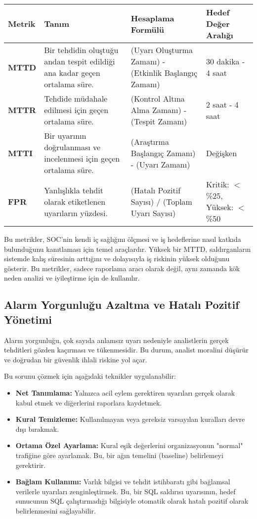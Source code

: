\begin{longtable}{|p{2cm}|p{3.5cm}|p{3.5cm}|p{3cm}|}
\hline
\textbf{Metrik} & \textbf{Tanım} & \textbf{Hesaplama Formülü} & \textbf{Hedef Değer Aralığı} \\
\hline
\textbf{MTTD} & Bir tehdidin oluştuğu andan tespit edildiği ana kadar geçen ortalama süre. & (Uyarı Oluşturma Zamanı) - (Etkinlik Başlangıç Zamanı) & 30 dakika - 4 saat \\
\hline
\textbf{MTTR} & Tehdide müdahale edilmesi için geçen ortalama süre. & (Kontrol Altına Alma Zamanı) - (Tespit Zamanı) & 2 saat - 4 saat \\
\hline
\textbf{MTTI} & Bir uyarının doğrulanması ve incelenmesi için geçen ortalama süre. & (Araştırma Başlangıç Zamanı) - (Uyarı Zamanı) & Değişken \\
\hline
\textbf{FPR} & Yanlışlıkla tehdit olarak etiketlenen uyarıların yüzdesi. & (Hatalı Pozitif Sayısı) / (Toplam Uyarı Sayısı) & Kritik: $<$\%25, Yüksek: $<$\%50 \\
\hline
\end{longtable}

Bu metrikler, SOC'nin kendi iç sağlığını ölçmesi ve iş hedeflerine nasıl katkıda bulunduğunu kanıtlaması için temel araçlardır. Yüksek bir MTTD, saldırganların sistemde kalış süresinin arttığını ve dolayısıyla iş riskinin yüksek olduğunu gösterir. Bu metrikler, sadece raporlama aracı olarak değil, aynı zamanda kök neden analizi ve iyileştirme için de kullanılır.

\subsection{Alarm Yorgunluğu Azaltma ve Hatalı Pozitif Yönetimi}

Alarm yorgunluğu, çok sayıda anlamsız uyarı nedeniyle analistlerin gerçek tehditleri gözden kaçırması ve tükenmesidir. Bu durum, analist moralini düşürür ve doğrudan bir güvenlik ihlali riskine yol açar.

Bu sorunu çözmek için aşağıdaki teknikler uygulanabilir:
\begin{itemize}
    \item \textbf{Net Tanımlama:} Yalnızca acil eylem gerektiren uyarıları gerçek olarak kabul etmek ve diğerlerini raporlara kaydetmek.
    \item \textbf{Kural Temizleme:} Kullanılmayan veya gereksiz varsayılan kuralları devre dışı bırakmak.
    \item \textbf{Ortama Özel Ayarlama:} Kural eşik değerlerini organizasyonun "normal" trafiğine göre ayarlamak. Bu, bir ağın temelini (baseline) belirlemeyi gerektirir.
    \item \textbf{Bağlam Kullanımı:} Varlık bilgisi ve tehdit istihbaratı gibi bağlamsal verilerle uyarıları zenginleştirmek. Bu, bir SQL saldırısı uyarısının, hedef sunucunun SQL çalıştırmadığı bilgisiyle otomatik olarak hatalı pozitif olarak belirlenmesini sağlayabilir.
\end{itemize}

